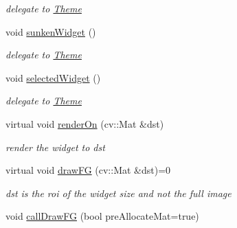 \begin{DoxyCompactItemize}
\begin{DoxyCompactList}\small\item\em delegate to \hyperlink{classcanvascv_1_1Theme}{Theme} \end{DoxyCompactList}\item 
void \hyperlink{classcanvascv_1_1Widget_ad4e11c2d30dc54520b80a442a07fb7a0}{sunken\+Widget} ()\hypertarget{classcanvascv_1_1Widget_ad4e11c2d30dc54520b80a442a07fb7a0}{}\label{classcanvascv_1_1Widget_ad4e11c2d30dc54520b80a442a07fb7a0}

\begin{DoxyCompactList}\small\item\em delegate to \hyperlink{classcanvascv_1_1Theme}{Theme} \end{DoxyCompactList}\item 
void \hyperlink{classcanvascv_1_1Widget_a92e0bbdd196ff9282ee738ad6861d4cb}{selected\+Widget} ()\hypertarget{classcanvascv_1_1Widget_a92e0bbdd196ff9282ee738ad6861d4cb}{}\label{classcanvascv_1_1Widget_a92e0bbdd196ff9282ee738ad6861d4cb}

\begin{DoxyCompactList}\small\item\em delegate to \hyperlink{classcanvascv_1_1Theme}{Theme} \end{DoxyCompactList}\item 
virtual void \hyperlink{classcanvascv_1_1Widget_a74130cdbcc974dfa7e8ceb9a53c112b9}{render\+On} (cv\+::\+Mat \&dst)
\begin{DoxyCompactList}\small\item\em render the widget to dst \end{DoxyCompactList}\item 
virtual void \hyperlink{classcanvascv_1_1Widget_a8143c9c92abd2a0e0e8ce4c3c50a0f7a}{draw\+FG} (cv\+::\+Mat \&dst)=0\hypertarget{classcanvascv_1_1Widget_a8143c9c92abd2a0e0e8ce4c3c50a0f7a}{}\label{classcanvascv_1_1Widget_a8143c9c92abd2a0e0e8ce4c3c50a0f7a}

\begin{DoxyCompactList}\small\item\em dst is the roi of the widget size and not the full image \end{DoxyCompactList}\item 
void \hyperlink{classcanvascv_1_1Widget_a4e25259aef4fd707add107f4e4229a9f}{call\+Draw\+FG} (bool pre\+Allocate\+Mat=true)\hypertarget{classcanvascv_1_1Widget_a4e25259aef4fd707add107f4e4229a9f}{}\label{classcanvascv_1_1Widget_a4e25259aef4fd707add107f4e4229a9f}


\end{DoxyCompactItemize}
